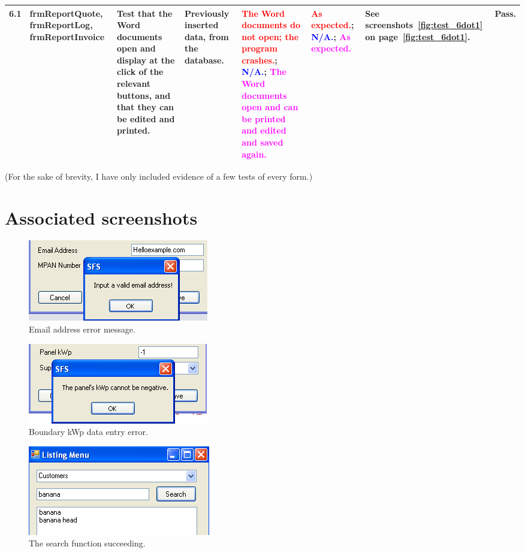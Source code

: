 \begin{landscape}
\begin{longtable}{ | p{1cm} | p{2.5cm} | p{4cm} | p{1cm} | p{3cm} | p{3cm} | p{1.5cm} | p{1cm} |}
	\hline
	6.1 & frmReportQuote, frmReportLog, frmReportInvoice & Test that the Word documents open and display at the click of the relevant buttons, and that they can be edited and printed. & Previously inserted data, from the database. & \textcolor{red}{The Word documents do not open; the program crashes.}; \textcolor{blue}{N\slash A.}; \textcolor{magenta}{The Word documents open and can be printed and edited and saved again.} & \textcolor{red}{As expected.}; \textcolor{blue}{N\slash A.}; \textcolor{magenta}{As expected.} & See screenshots~\ref{fig:test_6dot1} on page~\ref{fig:test_6dot1}. & Pass.\\
	\hline
\end{longtable}
\end{landscape}

(For the sake of brevity, I have only included evidence of a few tests of every form.)
\section{Associated screenshots}

\begin{figure}[ht]
	\centering
	\includegraphics[scale=0.5]{test_2dot2}
	\caption{Email address error message.}
	\label{fig:test_2dot2}
\end{figure}

\begin{figure}[ht]
	\centering
	\includegraphics[scale=0.5]{test_2dot8}
	\caption{Boundary kWp data entry error.}
	\label{fig:test_2dot8}
\end{figure}

\begin{figure}[ht]
	\centering
	\includegraphics[scale=0.5]{test_4dot1}
	\caption{The search function succeeding.}
	\label{fig:test_4dot1}
\end{figure}

